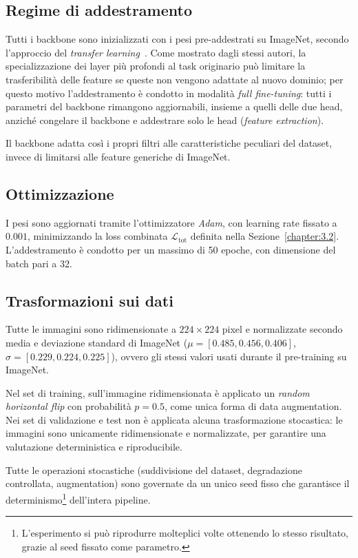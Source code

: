 \subsection{Regime di addestramento}

Tutti i backbone sono inizializzati con i pesi pre-addestrati su ImageNet, secondo l'approccio del \emph{transfer learning}~\cite{yosinski2014transferablefeaturesdeepneural}. 
Come mostrato dagli stessi autori, la specializzazione dei layer più profondi al task originario può limitare la trasferibilità delle feature se queste non vengono adattate al nuovo dominio; 
per questo motivo l'addestramento è condotto in modalità \emph{full fine-tuning}: tutti i parametri del backbone rimangono aggiornabili, 
insieme a quelli delle due head, anziché congelare il backbone e addestrare solo le head (\emph{feature extraction}).

Il backbone adatta così i propri filtri alle caratteristiche peculiari del dataset, invece di limitarsi alle feature generiche di ImageNet.

\subsection{Ottimizzazione}

I pesi sono aggiornati tramite l'ottimizzatore \emph{Adam}, con learning rate fissato a $0.001$, minimizzando la loss combinata $\mathcal{L}_{\text{tot}}$ definita nella Sezione~\ref{chapter:3.2}. L'addestramento è condotto per un massimo di 50 epoche, con dimensione del batch pari a 32.

\subsection{Trasformazioni sui dati}

Tutte le immagini sono ridimensionate a $224 \times 224$ pixel e normalizzate secondo media e deviazione standard di ImageNet ($\mu = [0.485, 0.456, 0.406]$, $\sigma = [0.229, 0.224, 0.225]$), 
ovvero gli stessi valori usati durante il pre-training su ImageNet.

Nel set di training, sull'immagine ridimensionata è applicato un \emph{random horizontal flip} con probabilità $p = 0.5$, come unica forma di data augmentation. Nei set di validazione e test non è applicata alcuna trasformazione stocastica: le immagini sono unicamente ridimensionate e normalizzate, per garantire una valutazione deterministica e riproducibile.

Tutte le operazioni stocastiche (suddivisione del dataset, degradazione controllata, augmentation) sono governate da un unico seed fisso
che garantisce il determinismo\footnote{L'esperimento si può riprodurre molteplici volte ottenendo lo stesso risultato, grazie al seed fissato come parametro.} dell'intera pipeline.

